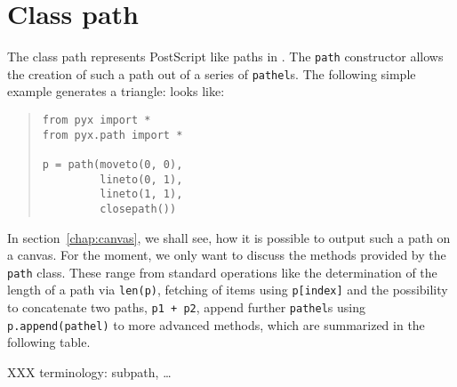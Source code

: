 \section{Class path}

The class path represents PostScript like paths in \PyX. The \verb|path| 
constructor allows the creation of such a path out of a series of 
\verb|pathel|s. The following simple example generates a triangle:
looks like:
\begin{quote}
\begin{verbatim}
from pyx import *
from pyx.path import *

p = path(moveto(0, 0), 
         lineto(0, 1),
         lineto(1, 1),
         closepath())
\end{verbatim}
\end{quote}
In section~\ref{chap:canvas}, we shall see, how it is possible to output such 
a path on a canvas. For the moment, we only want to discuss the methods 
provided by the \verb|path| class. These range from standard operations like 
the determination of the length of a path via \verb|len(p)|, fetching of
items using \verb|p[index]| and the possibility to concatenate two
paths, \verb|p1 + p2|, append further \verb|pathel|s using
\verb|p.append(pathel)| to more advanced methods, which are summarized
in the following table.

XXX terminology: subpath, \dots


